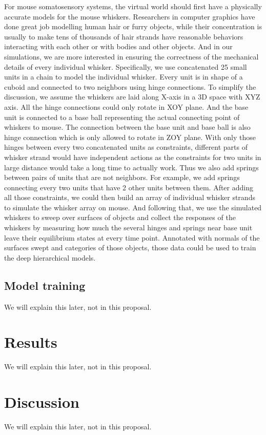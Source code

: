 \documentclass[12pt]{article}
\begin{document}
For mouse somatosensory systems, the virtual world should first have a physically accurate models for the mouse whiskers. 
Researchers in computer graphics have done great job modelling human hair or furry objects\cite{Hadap2008, Ward2007}, while their concentration is usually to make tens of thousands of hair strands have reasonable behaviors interacting with each other or with bodies and other objects. 
And in our simulations, we are more interested in ensuring the correctness of the mechanical details of every individual whisker. 
Specifically, we use concatenated 25 small units in a chain to model the individual whisker. Every unit is in shape of a cuboid and connected to two neighbors using hinge connections. 
To simplify the discussion, we assume the whiskers are laid along X-axis in a 3D space with XYZ axis. All the hinge connections could only rotate in XOY plane. And the base unit is connected to a base ball representing the actual connecting point of whiskers to mouse. The connection between the base unit and base ball is also hinge connection which is only allowed to rotate in ZOY plane.
With only those hinges between every two concatenated units as constraints, different parts of whisker strand would have independent actions as the constraints for two units in large distance would take a long time to actually work. Thus we also add springs between pairs of units that are not neighbors. For example, we add springs connecting every two units that have 2 other units between them.
After adding all those constraints, we could then build an array of individual whisker strands to simulate the whisker array on mouse. And following that, we use the simulated whiskers to sweep over surfaces of objects and collect the responses of the whiskers by measuring how much the several hinges and springs near base unit leave their equilibrium states at every time point. Annotated with normals of the surfaces swept and categories of those objects, those data could be used to train the deep hierarchical models.

\subsection*{Model training}

We will explain this later, not in this proposal.

\section*{Results}

We will explain this later, not in this proposal.

\section*{Discussion}

We will explain this later, not in this proposal.



%
%

\end{document}
